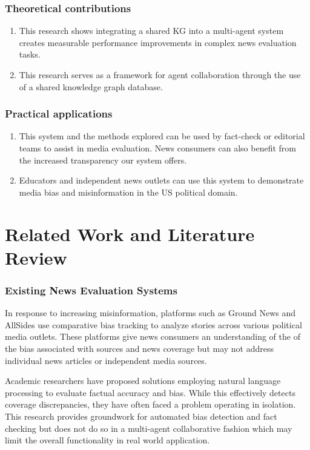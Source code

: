 \documentclass[11pt]{article}
\begin{document}
\subsubsection{Theoretical contributions}
\begin{enumerate}
    \item This research shows integrating a shared KG into a multi-agent system creates measurable performance improvements in complex news evaluation tasks.
        \item This research serves as a framework for agent collaboration through the use of a shared knowledge graph database.
\end{enumerate}

\subsubsection{Practical applications}
\begin{enumerate}
    \item This system and the methods explored can be used by fact-check or editorial teams to assist in media evaluation. News consumers can also benefit from the increased transparency our system offers. 
    \item Educators and independent news outlets can use this system to demonstrate media bias and misinformation in the US political domain. 


\end{enumerate}

\section{Related Work and Literature Review}
\subsubsection{Existing News Evaluation Systems}
In response to increasing misinformation, platforms such as Ground News\cite{r18} and AllSides use comparative bias tracking to analyze stories across various political media outlets. These platforms give news consumers an understanding of the of the bias associated with sources and news coverage but may not address individual news articles or independent media sources. 

Academic researchers have proposed solutions employing natural language processing to evaluate factual accuracy and bias\cite{r19}. While this effectively detects coverage discrepancies, they have often faced a problem operating in isolation.  This research provides groundwork for automated bias detection and fact checking but does not do so in a multi-agent collaborative fashion which may limit the overall functionality in real world application.
\end{document}
